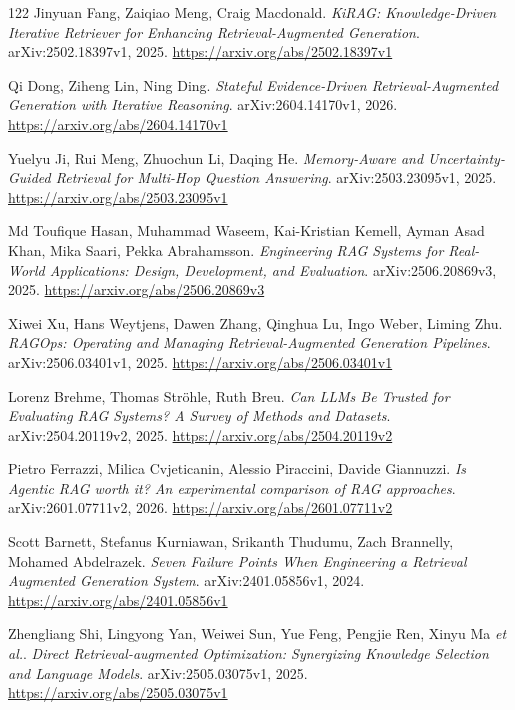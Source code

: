 \documentclass[11pt,a4paper]{article}
\begin{document}
\begin{thebibliography}{122}
Jinyuan Fang, Zaiqiao Meng, Craig Macdonald.
\newblock \emph{KiRAG: Knowledge-Driven Iterative Retriever for Enhancing Retrieval-Augmented Generation}.
\newblock arXiv:2502.18397v1, 2025.
\newblock \url{https://arxiv.org/abs/2502.18397v1}

Qi Dong, Ziheng Lin, Ning Ding.
\newblock \emph{Stateful Evidence-Driven Retrieval-Augmented Generation with Iterative Reasoning}.
\newblock arXiv:2604.14170v1, 2026.
\newblock \url{https://arxiv.org/abs/2604.14170v1}

Yuelyu Ji, Rui Meng, Zhuochun Li, Daqing He.
\newblock \emph{Memory-Aware and Uncertainty-Guided Retrieval for Multi-Hop Question Answering}.
\newblock arXiv:2503.23095v1, 2025.
\newblock \url{https://arxiv.org/abs/2503.23095v1}

Md Toufique Hasan, Muhammad Waseem, Kai-Kristian Kemell, Ayman Asad Khan, Mika Saari, Pekka Abrahamsson.
\newblock \emph{Engineering RAG Systems for Real-World Applications: Design, Development, and Evaluation}.
\newblock arXiv:2506.20869v3, 2025.
\newblock \url{https://arxiv.org/abs/2506.20869v3}

Xiwei Xu, Hans Weytjens, Dawen Zhang, Qinghua Lu, Ingo Weber, Liming Zhu.
\newblock \emph{RAGOps: Operating and Managing Retrieval-Augmented Generation Pipelines}.
\newblock arXiv:2506.03401v1, 2025.
\newblock \url{https://arxiv.org/abs/2506.03401v1}

Lorenz Brehme, Thomas Str\"{o}hle, Ruth Breu.
\newblock \emph{Can LLMs Be Trusted for Evaluating RAG Systems? A Survey of Methods and Datasets}.
\newblock arXiv:2504.20119v2, 2025.
\newblock \url{https://arxiv.org/abs/2504.20119v2}

Pietro Ferrazzi, Milica Cvjeticanin, Alessio Piraccini, Davide Giannuzzi.
\newblock \emph{Is Agentic RAG worth it? An experimental comparison of RAG approaches}.
\newblock arXiv:2601.07711v2, 2026.
\newblock \url{https://arxiv.org/abs/2601.07711v2}

Scott Barnett, Stefanus Kurniawan, Srikanth Thudumu, Zach Brannelly, Mohamed Abdelrazek.
\newblock \emph{Seven Failure Points When Engineering a Retrieval Augmented Generation System}.
\newblock arXiv:2401.05856v1, 2024.
\newblock \url{https://arxiv.org/abs/2401.05856v1}

Zhengliang Shi, Lingyong Yan, Weiwei Sun, Yue Feng, Pengjie Ren, Xinyu Ma \emph{et al.}.
\newblock \emph{Direct Retrieval-augmented Optimization: Synergizing Knowledge Selection and Language Models}.
\newblock arXiv:2505.03075v1, 2025.
\newblock \url{https://arxiv.org/abs/2505.03075v1}


\end{thebibliography}
\end{document}
